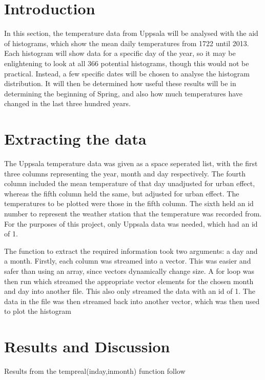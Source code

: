 \documentclass[a4paper,10pt,oneside]{article}
\author{Cameron Robertson}
\date{11/09/17}
\begin{document}
\section{Introduction}
\label{sec:intro}

 In this section, the temperature
data from Uppsala will be analysed with the aid of histograms, which show the mean daily
temperatures from 1722 until 2013. Each histogram will show data for a specific day of the year,
so it may be enlightening to look at all 366 potential histograms, though this would
not be practical. Instead, a few specific dates will be chosen to analyse the histogram
distribution. It will then be determined how useful these results will be in determining the beginning
of Spring, and also how much temperatures have changed in the last three hundred years.

\section{Extracting the data}
\label{sec:data}

The Uppsala temperature data was given as a space seperated list, with the first three
columns representing the year, month and day respectively. The fourth column included the mean
temperature of that day unadjusted for urban effect, whereas the fifth column held
the same, but adjusted for urban effect. The temperatures to be plotted were those 
in the fifth column. The sixth held an id number to represent the weather station
that the temperature was recorded from. For the purposes of this project, only Uppsala
data was needed, which had an id of 1.

The function to extract the required information took two arguments: a day and a month. Firstly, each column was streamed into a vector. This was
easier and safer than using an array, since vectors dynamically change size. A for loop was then run which streamed the appropriate vector elements for the
chosen month and day into another file. This also only streamed the data with an id of 1. The data in the file was then streamed back into another
vector, which was then used to plot the histogram

\section{Results and Discussion}
\label{sec:res}

Results from the tempreal(inday,inmonth) function follow
\end{document}

